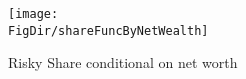 \begin{figure}[h]
	\centering
	\texttt{[image: \\FigDir/shareFuncByNetWealth]}
	\caption{Risky Share conditional on net worth}
	\label{fig:shareFuncByNetWealth}
\end{figure}
